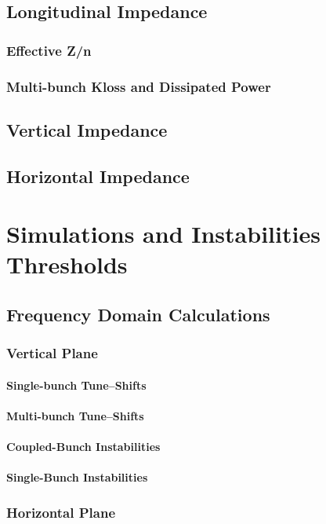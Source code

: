 \section{Longitudinal Impedance}
\subsection{Effective Z/n}
\subsection{Multi-bunch Kloss and Dissipated Power}
\section{Vertical Impedance}
\section{Horizontal Impedance}

\chapter{Simulations and Instabilities Thresholds}
\section{Frequency Domain Calculations}
\subsection{Vertical Plane}
\subsubsection{Single-bunch Tune--Shifts}
\subsubsection{Multi-bunch Tune--Shifts}
\subsubsection{Coupled-Bunch Instabilities}
\subsubsection{Single-Bunch Instabilities}
\subsection{Horizontal Plane}
